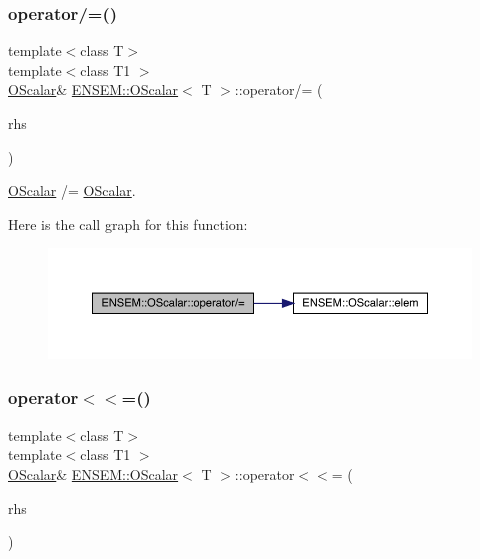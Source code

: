 \subsubsection{\texorpdfstring{operator/=()}{operator/=()}\hspace{0.1cm}{\footnotesize\ttfamily [2/2]}}
{\footnotesize\ttfamily template$<$class T$>$ \\
template$<$class T1 $>$ \\
\mbox{\hyperlink{classENSEM_1_1OScalar}{O\+Scalar}}\& \mbox{\hyperlink{classENSEM_1_1OScalar}{E\+N\+S\+E\+M\+::\+O\+Scalar}}$<$ T $>$\+::operator/= (\begin{DoxyParamCaption}\item[{const \mbox{\hyperlink{classENSEM_1_1OScalar}{O\+Scalar}}$<$ T1 $>$ \&}]{rhs }\end{DoxyParamCaption})\hspace{0.3cm}{\ttfamily [inline]}}



\mbox{\hyperlink{classENSEM_1_1OScalar}{O\+Scalar}} /= \mbox{\hyperlink{classENSEM_1_1OScalar}{O\+Scalar}}. 

Here is the call graph for this function\+:
\nopagebreak
\begin{figure}[H]
\begin{center}
\leavevmode
\includegraphics[width=350pt]{da/d80/classENSEM_1_1OScalar_a1e0517e29754a8acb284c3ac266c2b2c_cgraph}
\end{center}
\end{figure}
\mbox{\label{classENSEM_1_1OScalar_a93607b92c63ae779d9d3ed131df3f449}} 
\subsubsection{\texorpdfstring{operator$<$$<$=()}{operator<<=()}\hspace{0.1cm}{\footnotesize\ttfamily [1/2]}}
{\footnotesize\ttfamily template$<$class T$>$ \\
template$<$class T1 $>$ \\
\mbox{\hyperlink{classENSEM_1_1OScalar}{O\+Scalar}}\& \mbox{\hyperlink{classENSEM_1_1OScalar}{E\+N\+S\+E\+M\+::\+O\+Scalar}}$<$ T $>$\+::operator$<$$<$= (\begin{DoxyParamCaption}\item[{const \mbox{\hyperlink{classENSEM_1_1OScalar}{O\+Scalar}}$<$ T1 $>$ \&}]{rhs }\end{DoxyParamCaption})\hspace{0.3cm}{\ttfamily [inline]}}



